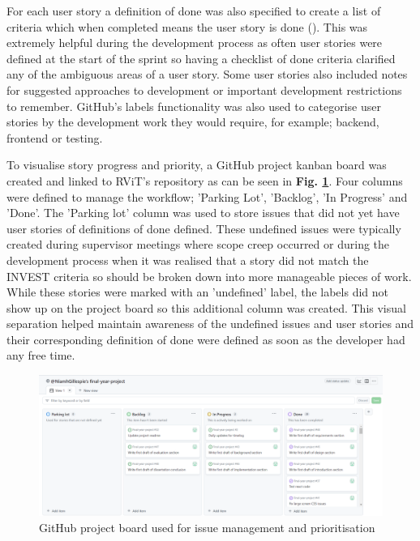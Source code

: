 \documentclass[l4proj.tex]{subfiles}
\begin{document}
For each user story a definition of done was also specified to create a list of criteria which when completed means the user story is done (\cite{Silva2017}). This was extremely helpful during the development process as often user stories were defined at the start of the sprint so having a checklist of done criteria clarified any of the ambiguous areas of a user story. Some user stories also included notes for suggested approaches to development or important development restrictions to remember. GitHub's labels functionality was also used to categorise user stories by the development work they would require, for example; backend, frontend or testing. 

To visualise story progress and priority, a GitHub project kanban board was created and linked to RViT's repository as can be seen in \textbf{Fig. \ref{fig:My Github issue board}}. Four columns were defined to manage the workflow; 'Parking Lot', 'Backlog', 'In Progress' and 'Done'. The 'Parking lot' column was used to store issues that did not yet have user stories of definitions of done defined. These undefined issues were typically created during supervisor meetings where scope creep occurred or during the development process when it was realised that a story did not match the INVEST criteria so should be broken down into more manageable pieces of work. While these stories were marked with an 'undefined' label, the labels did not show up on the project board so this additional column was created. This visual separation helped maintain awareness of the undefined issues and user stories and their corresponding definition of done were defined as soon as the developer had any free time.

\begin{figure}[h!]
\begin{center}
\includegraphics[scale=0.4]{dissertation/images/ImplementationIssueBoard.png}
\caption{GitHub project board used for issue management and prioritisation}
\label{fig:My Github issue board} 
\end{center}
\end{figure}
\end{document}
